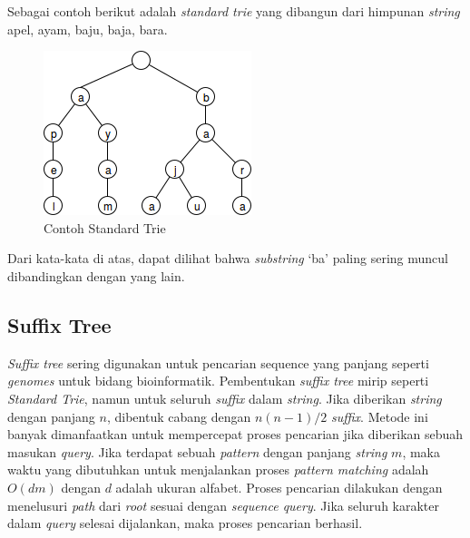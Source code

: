 Sebagai contoh berikut adalah \textit{standard trie} yang dibangun dari himpunan \textit{string} {apel, ayam, baju, baja, bara}.
\begin{figure}
    \centering
    \includegraphics[scale=0.6]{pics/Contoh-StandardTrie}
    \caption{Contoh Standard Trie}
    \label{fig:contoh-standard-trie}
\end{figure}

\noindent Dari kata-kata di atas, dapat dilihat bahwa \textit{substring} `ba' paling sering muncul dibandingkan dengan yang lain.

\subsection{Suffix Tree} \label{sec:suffix-tree}
\textit{Suffix tree} sering digunakan untuk pencarian sequence yang panjang seperti \textit{genomes} untuk bidang bioinformatik. Pembentukan \textit{suffix tree} mirip seperti \textit{Standard Trie}, namun untuk seluruh \textit{suffix} dalam \textit{string}. Jika diberikan \textit{string} dengan panjang $n$, dibentuk cabang dengan $n(n-1)/2$ \textit{suffix}.  Metode ini banyak dimanfaatkan untuk mempercepat proses pencarian jika diberikan sebuah masukan \textit{query}. Jika terdapat sebuah \textit{pattern} dengan panjang \textit{string} $m$, maka waktu yang dibutuhkan untuk menjalankan proses \textit{pattern matching} adalah $O(dm)$ dengan $d$ adalah ukuran alfabet. Proses pencarian dilakukan dengan menelusuri \textit{path} dari \textit{root} sesuai dengan \textit{sequence query}. Jika seluruh karakter dalam \textit{query} selesai dijalankan, maka proses pencarian berhasil. 

